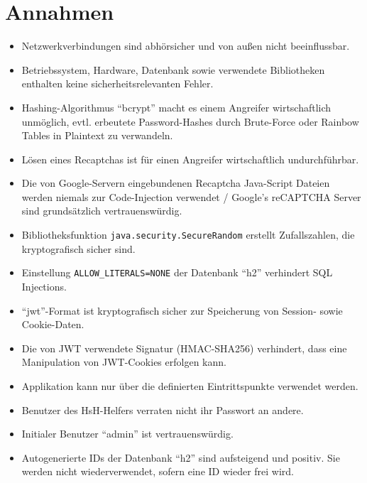\documentclass[fontsize=12pt,DIV=14,BCOR=10mm,a4paper,parskip=half-,headsepline,headinclude,english,ngerman,bibliography=totocnumbered]{scrreprt}
\begin{document}
\vspace*{-3cm}

\addto{\captionsgerman}{\renewcommand{\refname}{Literaturverzeichnis}}

\clearpage

\tableofcontents  %

\clearpage

\chapter{Annahmen}

\begin{itemize}
  \item Netzwerkverbindungen sind abhörsicher und von außen nicht beeinflussbar.
  \item Betriebssystem, Hardware, Datenbank sowie verwendete Bibliotheken enthalten keine sicherheitsrelevanten Fehler.
  \item Hashing-Algorithmus \enquote{bcrypt} macht es einem Angreifer wirtschaftlich unmöglich, evtl. erbeutete Password-Hashes durch Brute-Force oder Rainbow Tables in Plaintext zu verwandeln.
  \item Lösen eines Recaptchas ist für einen Angreifer wirtschaftlich undurchführbar.
  \item Die von Google-Servern eingebundenen Recaptcha Java-Script Dateien werden niemals zur Code-Injection verwendet / Google's reCAPTCHA Server sind grund\-sätzlich vertrauenswürdig.
  \item Bibliotheksfunktion \texttt{java.security.SecureRandom} \autocite{JavaDocs.SecureRandom} erstellt Zufallszahlen, die kryptografisch sicher sind.
  \item Einstellung \texttt{ALLOW\_LITERALS=NONE} der Datenbank \enquote{h2} verhindert SQL Injections.
  \item \enquote{\gls{jwt}}-Format ist kryptografisch sicher zur Speicherung von Session- sowie Cookie-Daten.
  \item Die von JWT verwendete Signatur (HMAC-SHA256) verhindert, dass eine Manipulation von JWT-Cookies erfolgen kann.
  \item Applikation kann nur über die definierten Eintrittspunkte verwendet werden.
  \item Benutzer des HsH-Helfers verraten nicht ihr Passwort an andere.
  \item Initialer Benutzer \enquote{admin} ist vertrauenswürdig.
  \item Autogenerierte IDs der Datenbank \enquote{h2} sind aufsteigend und positiv. Sie werden nicht wiederverwendet, sofern eine ID wieder frei wird.

\end{itemize}
\end{document}
